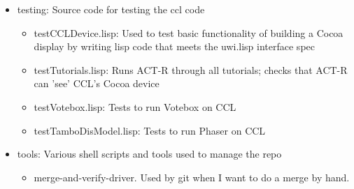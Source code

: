 \documentclass[12pt]{article} %
\begin{document}
\begin{itemize}
\item testing: Source code for testing the ccl code
	\begin{itemize}
	\item testCCLDevice.lisp: Used to test basic functionality of building a Cocoa display by writing lisp code that meets the uwi.lisp interface spec
	\item testTutorials.lisp: Runs ACT-R through all tutorials; checks that ACT-R can 'see' CCL's Cocoa device
	\item testVotebox.lisp: Tests to run Votebox on CCL
	\item testTamboDisModel.lisp: Tests to run Phaser on CCL
	\end{itemize}

\item tools: Various shell scripts and tools used to manage the repo
	\begin{itemize}
	\item merge-and-verify-driver. Used by git when I want to do a merge by hand.
	\end{itemize}

\end{itemize}
\end{document}
